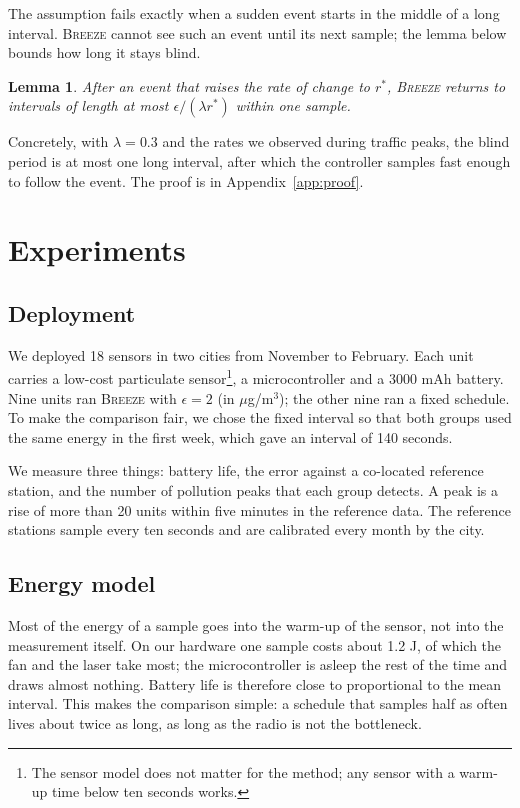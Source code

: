 \documentclass{article}
\newtheorem{lem}[thm]{Lemma}
\newcommand{\sys}{\textsc{Breeze}\xspace}
\begin{document}
The assumption fails exactly when a sudden event starts in the middle of a
long interval. \sys cannot see such an event until its next sample; the
lemma below bounds how long it stays blind.

\begin{lem}\label{lem:blind}
  After an event that raises the rate of change to $r^\ast$, \sys returns to intervals of length at most
  $\epsilon / (\lambda r^\ast)$ within one sample.
\end{lem}

Concretely, with $\lambda = 0.3$ and the rates we observed during traffic
peaks, the blind period is at most one long interval, after which the
controller samples fast enough to follow the event. The proof is in
Appendix~\ref{app:proof}.

\section{Experiments}

\subsection{Deployment}

We deployed 18 sensors in two cities from November to February. Each unit
carries a low-cost particulate sensor\footnote{The sensor model does not
matter for the method; any sensor with a warm-up time below ten seconds
works.}, a microcontroller and a 3000 mAh battery. Nine units ran \sys with
$\epsilon = 2$ (in $\mu$g/m$^3$); the other nine ran a fixed schedule. To
make the comparison fair, we chose the fixed interval so that both groups
used the same energy in the first week, which gave an interval of 140
seconds.

We measure three things: battery life, the error against a co-located
reference station, and the number of pollution peaks that each group
detects. A peak is a rise of more than 20 units within five minutes in the
reference data. The reference stations sample every ten seconds and are
calibrated every month by the city.

\subsection{Energy model}

Most of the energy of a sample goes into the warm-up of the sensor, not into
the measurement itself. On our hardware one sample costs about 1.2 J, of
which the fan and the laser take most; the microcontroller is asleep the
rest of the time and draws almost nothing. Battery life is therefore close
to proportional to the mean interval. This makes the comparison simple: a
schedule that samples half as often lives about twice as long, as long as
the radio is not the bottleneck.
\end{document}
